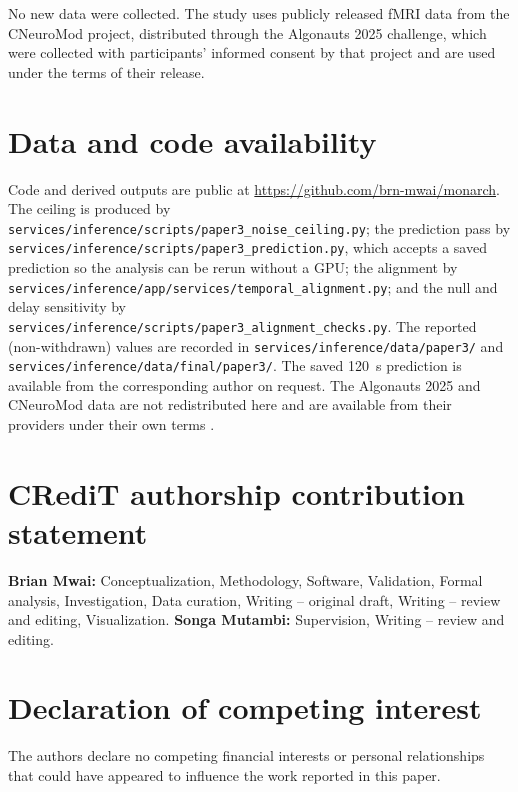 \documentclass[preprint,12pt]{elsarticle}
\begin{document}
No new data were collected. The study uses publicly released fMRI data from the CNeuroMod
project, distributed through the Algonauts 2025 challenge, which were collected with
participants' informed consent by that project and are used under the terms of their release.

\section*{Data and code availability}

Code and derived outputs are public at \url{https://github.com/brn-mwai/monarch}. The ceiling
is produced by \nolinkurl{services/inference/scripts/paper3_noise_ceiling.py}; the prediction
pass by \nolinkurl{services/inference/scripts/paper3_prediction.py}, which accepts a saved
prediction so the analysis can be rerun without a GPU; the alignment by
\nolinkurl{services/inference/app/services/temporal_alignment.py}; and the null and delay
sensitivity by \nolinkurl{services/inference/scripts/paper3_alignment_checks.py}. The reported
(non-withdrawn) values are recorded in \nolinkurl{services/inference/data/paper3/} and
\nolinkurl{services/inference/data/final/paper3/}.
The saved 120~s prediction is available from the corresponding author on request. The Algonauts 2025 and
CNeuroMod data are not redistributed here and are available from their providers under their
own terms \cite{algonauts2025,cneuromod2023}.

\section*{CRediT authorship contribution statement}

\textbf{Brian Mwai:} Conceptualization, Methodology, Software, Validation, Formal analysis,
Investigation, Data curation, Writing -- original draft, Writing -- review and editing,
Visualization.
\textbf{Songa Mutambi:} Supervision, Writing -- review and editing.

\section*{Declaration of competing interest}

The authors declare no competing financial interests or personal relationships that could
have appeared to influence the work reported in this paper.
\end{document}
